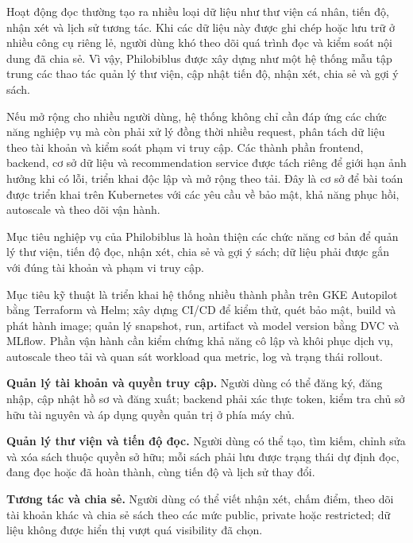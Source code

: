Hoạt động đọc thường tạo ra nhiều loại dữ liệu như thư viện cá nhân, tiến độ, nhận xét và lịch sử tương tác. Khi các dữ liệu này được ghi chép hoặc lưu trữ ở nhiều công cụ riêng lẻ, người dùng khó theo dõi quá trình đọc và kiểm soát nội dung đã chia sẻ. Vì vậy, Philobiblus được xây dựng như một hệ thống mẫu tập trung các thao tác quản lý thư viện, cập nhật tiến độ, nhận xét, chia sẻ và gợi ý sách.

Nếu mở rộng cho nhiều người dùng, hệ thống không chỉ cần đáp ứng các chức năng nghiệp vụ mà còn phải xử lý đồng thời nhiều request, phân tách dữ liệu theo tài khoản và kiểm soát phạm vi truy cập. Các thành phần frontend, backend, cơ sở dữ liệu và recommendation service được tách riêng để giới hạn ảnh hưởng khi có lỗi, triển khai độc lập và mở rộng theo tải. Đây là cơ sở để bài toán được triển khai trên Kubernetes với các yêu cầu về bảo mật, khả năng phục hồi, autoscale và theo dõi vận hành.

Mục tiêu nghiệp vụ của Philobiblus là hoàn thiện các chức năng cơ bản để quản lý thư viện, tiến độ đọc, nhận xét, chia sẻ và gợi ý sách; dữ liệu phải được gắn với đúng tài khoản và phạm vi truy cập.

Mục tiêu kỹ thuật là triển khai hệ thống nhiều thành phần trên GKE Autopilot bằng Terraform và Helm; xây dựng CI/CD để kiểm thử, quét bảo mật, build và phát hành image; quản lý snapshot, run, artifact và model version bằng DVC và MLflow. Phần vận hành cần kiểm chứng khả năng cô lập và khôi phục dịch vụ, autoscale theo tải và quan sát workload qua metric, log và trạng thái rollout.

\textbf{Quản lý tài khoản và quyền truy cập.} Người dùng có thể đăng ký, đăng nhập, cập nhật hồ sơ và đăng xuất; backend phải xác thực token, kiểm tra chủ sở hữu tài nguyên và áp dụng quyền quản trị ở phía máy chủ.

\textbf{Quản lý thư viện và tiến độ đọc.} Người dùng có thể tạo, tìm kiếm, chỉnh sửa và xóa sách thuộc quyền sở hữu; mỗi sách phải lưu được trạng thái dự định đọc, đang đọc hoặc đã hoàn thành, cùng tiến độ và lịch sử thay đổi.

\textbf{Tương tác và chia sẻ.} Người dùng có thể viết nhận xét, chấm điểm, theo dõi tài khoản khác và chia sẻ sách theo các mức public, private hoặc restricted; dữ liệu không được hiển thị vượt quá visibility đã chọn.

